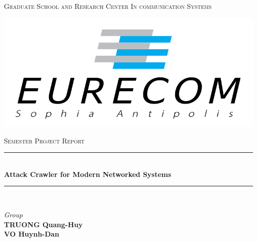 \documentclass[a4paper,12pt,oneside]{report}
\begin{document}
\begin{titlepage}

\newcommand{\HRule}{\rule{\linewidth}{0.5mm}} %

\center %
 

\textsc{ 
	Graduate School and Research Center In communication Systems} %
\begin{center}
\includegraphics[scale=0.5]{eurecom.png}
\end{center}

\textsc{\large Semester Project Report}\\[2cm] %


\HRule \\[0.4cm]
{ \Large \bfseries Attack Crawler for Modern Networked Systems}\\[0.4cm] %
\HRule \\[1.5cm]


 

\begin{minipage}{0.57\textwidth}
\begin{flushleft} 
\emph{Group}\\
\quad \textbf{TRUONG Quang-Huy}\\
\quad \textbf{VO Huynh-Dan}\\



\end{flushleft}
\end{minipage}
\end{titlepage}
\end{document}
